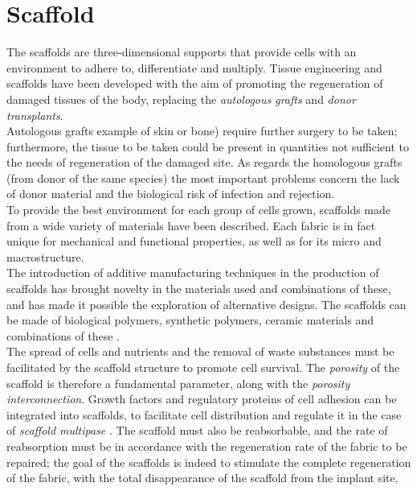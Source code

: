 
\chapter{Scaffold} %

\label{Chapter7} %

 
 

The scaffolds are three-dimensional supports that provide cells with an environment to adhere to, differentiate and multiply. Tissue engineering and scaffolds have been developed with the aim of promoting the regeneration of damaged tissues of the body, replacing the \emph{autologous grafts} and \emph{donor transplants}. \\ Autologous grafts example of skin or bone) require further surgery to be taken; furthermore, the tissue to be taken could be present in quantities not sufficient to the needs of regeneration of the damaged site. As regards the homologous grafts (from donor of the same species) the most important problems concern the lack of donor material and the biological risk of infection and rejection. \\
To provide the best environment for each group of cells grown, scaffolds made from a wide variety of materials have been described. Each fabric is in fact unique for mechanical and functional properties, as well as for its micro and macrostructure. \\ The introduction of additive manufacturing techniques in the production of scaffolds has brought novelty in the materials used and combinations of these, and has made it possible the exploration of alternative designs. The scaffolds can be made of biological polymers, synthetic polymers, ceramic materials and combinations of these \parencites{Reference128}. \\
The spread of cells and nutrients and the removal of waste substances must be facilitated by the scaffold structure to promote cell survival. The \emph{porosity} of the scaffold is therefore a fundamental parameter, along with the \emph{porosity interconnection}. Growth factors and regulatory proteins of cell adhesion can be integrated into scaffolds, to facilitate cell distribution and regulate it in the case of \emph{scaffold multipase} \parencite{Reference129}. The scaffold must also be reabsorbable, and the rate of reabsorption must be in accordance with the regeneration rate of the fabric to be repaired; the goal of the scaffolds is indeed to stimulate the complete regeneration of the fabric, with the total disappearance of the scaffold from the implant site. \\

